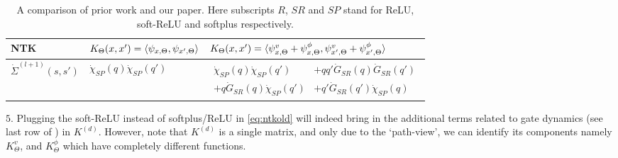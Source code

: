 \begin{table}[h]
{\begin{tabular}{|l|l|l|}
NTK			&$K_{\Theta}(x,x')=\langle \psi_{x,\Theta},\psi_{x',\Theta}\rangle$														&$K_{\Theta}(x,x')=\langle \psi^v_{x,\Theta}+\psi^{\phi}_{x,\Theta},\psi^v_{x',\Theta}+\psi^{\phi}_{x',\Theta}\rangle$	\\\hline		
$\dot{\Sigma}^{(l+1)}(s,s')$	&$\dot{\chi}_{SP}(q)\dot{\chi}_{SP}(q')$ &$\begin{aligned}\dot{\chi}_{SP}(q)\dot{\chi}_{SP}(q')&+qq'\dot{G}_{SR}(q)\dot{G}_{SR}(q')\\ +q\dot{G}_{SR}(q)\dot{\chi}_{SP}(q')&+q'\dot{G}_{SR}(q')\dot{\chi}_{SP}(q)\end{aligned}$\\\hline


\end{tabular}
}
\caption{A comparison of prior work and our paper. Here subscripts $R$, $SR$ and $SP$ stand for ReLU, soft-ReLU and softplus respectively.}
\label{tb:compare}
\end{table}
$5.$ Plugging the soft-ReLU instead of softplus/ReLU in \eqref{eq:ntkold} will indeed bring in the additional terms related to gate dynamics (see last row of ) in $K^{(d)}$. However, note that $K^{(d)}$ is a single matrix, and only due to the `path-view', we can identify its components namely $K^v_{\Theta}$, and $K^{\phi}_{\Theta}$ which have completely different functions.
